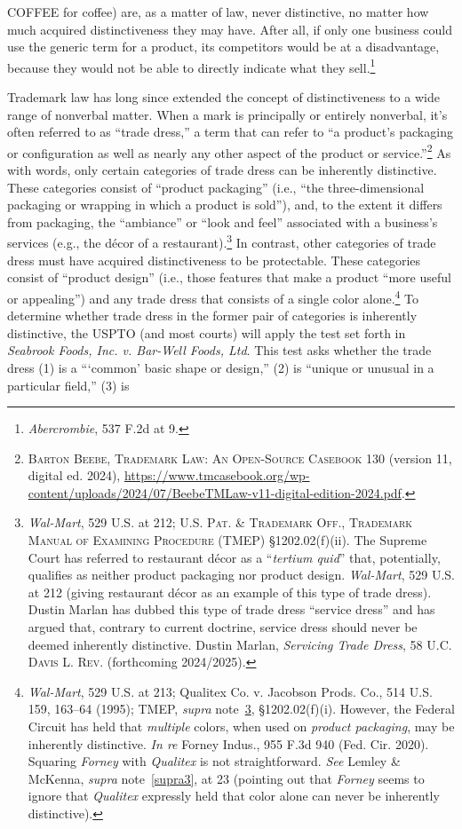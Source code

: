 \documentclass[letterpaper, 11pt, oneside]{article}
\begin{document}
COFFEE for coffee) are, as a matter of law, never distinctive, no matter how much acquired distinctiveness they may have. After all, if only one business could use the generic term for a product, its competitors would be at a disadvantage, because they would not be able to directly indicate what they sell.\footnote{\textit{Abercrombie}, 537 F.2d at 9.}

Trademark law has long since extended the concept of distinctiveness to a wide range of nonverbal matter. When a mark is principally or entirely nonverbal, it's often referred to as ``trade dress,'' a term that can refer to ``a product’s packaging or configuration as well as nearly any other aspect of the product or service.''\footnote{\textsc{Barton Beebe, Trademark Law: An Open-Source Casebook} 130 (version 11, digital ed. 2024), \url{https://www.tmcasebook.org/wp-content/uploads/2024/07/BeebeTMLaw-v11-digital-edition-2024.pdf}.} As with words, only certain categories of trade dress can be inherently distinctive. These categories consist of ``product packaging'' (i.e., ``the three-dimensional packaging or wrapping in which a product is sold''), and, to the extent it differs from packaging, the ``ambiance'' or ``look and feel'' associated with a business's services (e.g., the décor of a restaurant).\footnote{\label{supra12} \textit{Wal-Mart}, 529 U.S. at 212; \textsc{U.S. Pat. \& Trademark Off., Trademark Manual of Examining Procedure} (TMEP) \S 1202.02(f)(ii). The Supreme Court has referred to restaurant décor as a ``\textit{tertium quid}'' that, potentially, qualifies as neither product packaging nor product design. \textit{Wal-Mart}, 529 U.S. at 212 (giving restaurant décor as an example of this type of trade dress). Dustin Marlan has dubbed this type of trade dress ``service dress'' and has argued that, contrary to current doctrine, service dress should never be deemed inherently distinctive. Dustin Marlan, \textit{Servicing Trade Dress}, 58 \textsc{U.C. Davis L. Rev.} (forthcoming 2024/2025).} In contrast, other categories of trade dress must have acquired distinctiveness to be protectable. These categories consist of ``product design'' (i.e., those features that make a product ``more useful or appealing'') and any trade dress that consists of a single color alone.\footnote{\textit{Wal-Mart}, 529 U.S. at 213; Qualitex Co. v. Jacobson Prods. Co., 514 U.S. 159, 163–64 (1995); TMEP, \textit{supra} note~\ref{supra12}, \S 1202.02(f)(i). However, the Federal Circuit has held that \textit{multiple} colors, when used on \textit{product packaging}, may be inherently distinctive. \textit{In re} Forney Indus., 955 F.3d 940 (Fed. Cir. 2020). Squaring \textit{Forney} with \textit{Qualitex} is not straightforward. \textit{See} Lemley \& McKenna, \textit{supra} note~\ref{supra3}, at 23 (pointing out that \textit{Forney} seems to ignore that \textit{Qualitex} expressly held that color alone can never be inherently distinctive).} To determine whether trade dress in the former pair of categories is inherently distinctive, the USPTO (and most courts) will apply the test set forth in \textit{Seabrook Foods, Inc. v. Bar-Well Foods, Ltd}. This test asks whether the trade dress (1) is a ```common' basic shape or design,'' (2) is ``unique or unusual in a particular field,'' (3) is 
\end{document}
